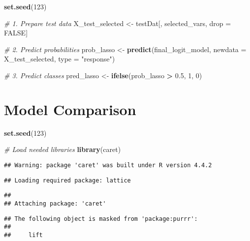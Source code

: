 \documentclass[
]{article}
\newenvironment{Shaded}{\begin{snugshade}}{\end{snugshade}}
\newcommand{\AttributeTok}[1]{\textcolor[rgb]{0.13,0.29,0.53}{#1}}
\newcommand{\CommentTok}[1]{\textcolor[rgb]{0.56,0.35,0.01}{\textit{#1}}}
\newcommand{\ConstantTok}[1]{\textcolor[rgb]{0.56,0.35,0.01}{#1}}
\newcommand{\DecValTok}[1]{\textcolor[rgb]{0.00,0.00,0.81}{#1}}
\newcommand{\FloatTok}[1]{\textcolor[rgb]{0.00,0.00,0.81}{#1}}
\newcommand{\FunctionTok}[1]{\textcolor[rgb]{0.13,0.29,0.53}{\textbf{#1}}}
\newcommand{\NormalTok}[1]{#1}
\newcommand{\OtherTok}[1]{\textcolor[rgb]{0.56,0.35,0.01}{#1}}
\newcommand{\SpecialCharTok}[1]{\textcolor[rgb]{0.81,0.36,0.00}{\textbf{#1}}}
\newcommand{\StringTok}[1]{\textcolor[rgb]{0.31,0.60,0.02}{#1}}
\begin{document}
\begin{Shaded}
\begin{Highlighting}[]
\FunctionTok{set.seed}\NormalTok{(}\DecValTok{123}\NormalTok{)}

\CommentTok{\# 1. Prepare test data}
\NormalTok{X\_test\_selected }\OtherTok{\textless{}{-}}\NormalTok{ testDat[, selected\_vars, drop }\OtherTok{=} \ConstantTok{FALSE}\NormalTok{]}

\CommentTok{\# 2. Predict probabilities}
\NormalTok{prob\_lasso }\OtherTok{\textless{}{-}} \FunctionTok{predict}\NormalTok{(final\_logit\_model, }\AttributeTok{newdata =}\NormalTok{ X\_test\_selected, }\AttributeTok{type =} \StringTok{"response"}\NormalTok{)}

\CommentTok{\# 3. Predict classes}
\NormalTok{pred\_lasso }\OtherTok{\textless{}{-}} \FunctionTok{ifelse}\NormalTok{(prob\_lasso }\SpecialCharTok{\textgreater{}} \FloatTok{0.5}\NormalTok{, }\DecValTok{1}\NormalTok{, }\DecValTok{0}\NormalTok{)}
\end{Highlighting}
\end{Shaded}

\section{Model Comparison}\label{model-comparison}

\begin{Shaded}
\begin{Highlighting}[]
\FunctionTok{set.seed}\NormalTok{(}\DecValTok{123}\NormalTok{)}

\CommentTok{\# Load needed libraries}
\FunctionTok{library}\NormalTok{(caret)}
\end{Highlighting}
\end{Shaded}

\begin{verbatim}
## Warning: package 'caret' was built under R version 4.4.2
\end{verbatim}

\begin{verbatim}
## Loading required package: lattice
\end{verbatim}

\begin{verbatim}
## 
## Attaching package: 'caret'
\end{verbatim}

\begin{verbatim}
## The following object is masked from 'package:purrr':
## 
##     lift
\end{verbatim}
\end{document}
